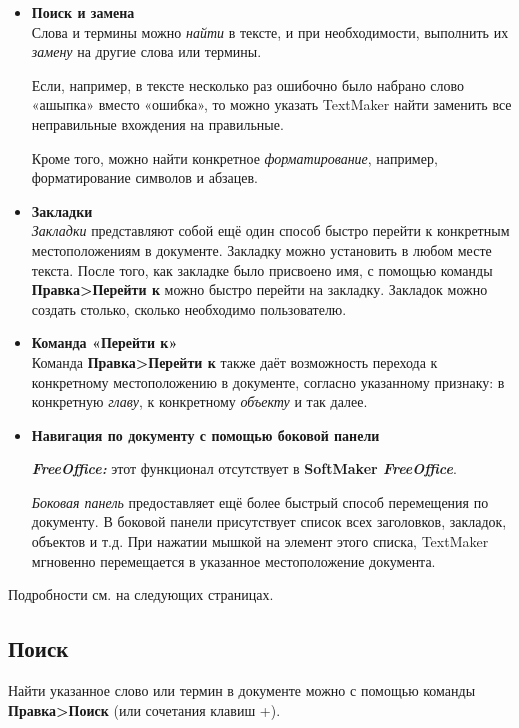 \documentclass[a4paper,10pt]{article}
\begin{document}
\begin{itemize}
 \item \textbf{Поиск и замена}\\
 Слова и термины можно \textit{найти} в тексте, и при необходимости, выполнить их \textit{замену} на другие слова или термины.
 
 Если, например, в тексте несколько раз ошибочно было набрано слово «ашыпка» вместо «ошибка», то можно указать TextMaker найти заменить все неправильные вхождения на правильные.
 
 Кроме того, можно найти конкретное \textit{форматирование}, например, форматирование символов и абзацев.
 \item \textbf{Закладки}\\
 \textit{Закладки} представляют собой ещё один способ быстро перейти к конкретным местоположениям в документе. Закладку можно установить в любом месте текста. После того, как закладке было присвоено имя, с помощью команды \textbf{Правка>Перейти к} можно быстро перейти на закладку. Закладок можно создать столько, сколько необходимо пользователю.
 \item \textbf{Команда «Перейти к»}\\
 Команда \textbf{Правка>Перейти к} также даёт возможность перехода к конкретному местоположению в документе, согласно указанному признаку: в конкретную \textit{главу}, к конкретному \textit{объекту} и так далее.
 \item \textbf{Навигация по документу с помощью боковой панели}\\
 \begin{mdframed}[backgroundcolor=pink!50]
\textbf{\textit{FreeOffice:}} этот функционал отсутствует в \textbf{SoftMaker \textit{FreeOffice}}.
\end{mdframed}
\textit{Боковая панель} предоставляет ещё более быстрый способ перемещения по документу.  В боковой панели присутствует список всех заголовков, закладок, объектов и т.д. При нажатии мышкой на элемент этого списка, TextMaker мгновенно перемещается в указанное местоположение документа.
\end{itemize}

Подробности см. на следующих страницах.

\subsection{Поиск}
Найти указанное слово или термин в документе можно с помощью команды \textbf{Правка>Поиск} (или сочетания клавиш +).
\end{document}

